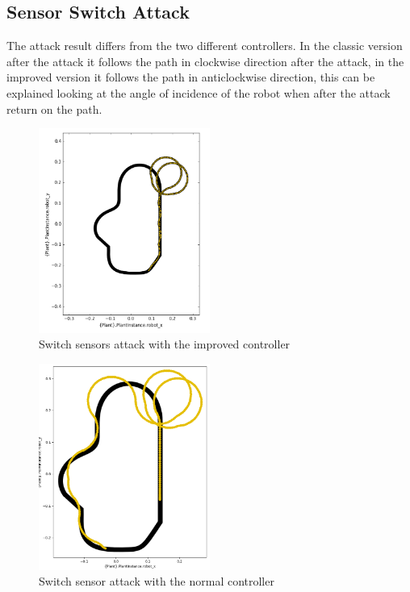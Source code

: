 \subsection{Sensor Switch Attack}

The attack result differs from the two different controllers. In the classic
version after the attack it follows the path in clockwise direction after the
attack, in the improved version it follows the path in anticlockwise direction,
this can be explained looking at the angle of incidence of the robot when after
the attack return on the path.

\begin{figure}[htb]
	\centering
	\includegraphics[width=0.5\textwidth]{img/mm_switch_sensors_attack_improved.png}
	\caption{Switch sensors attack with the improved controller}\label{fig:switchsenattim}
\end{figure}

\begin{figure}[htb]
	\centering
	\includegraphics[width=0.5\textwidth]{img/switch-sensors-attack.png}
	\caption{Switch sensor attack with the normal controller}\label{fig:switchsenatt}
\end{figure}
